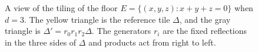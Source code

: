 \documentclass[11pt,letterpaper]{article}
\begin{document}
\begin{figure}[!htbp]
{}
      \caption{A view of the tiling of the floor $E=\{(x,y,z):x+y+z=0\}$ when $d=3$. The yellow triangle is the reference tile $\Delta$, and the gray triangle is $\Delta'=r_0r_1r_2\Delta$. The generators $r_i$ are the fixed reflections in the three sides of $\Delta$ and products act from right to left.}
      \label{fig:triangles}
\end{figure}
\end{document}
